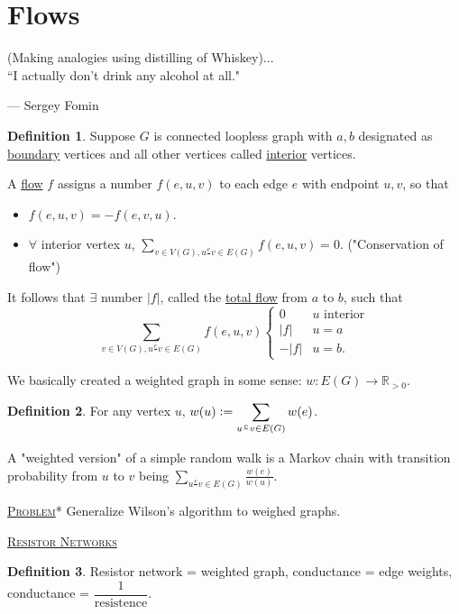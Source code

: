 \documentclass{report}
\newcommand{\R}{\mathbb{R}}
\newcommand{\defeq}{\vcentcolon=}
\newcommand{\fancyem}[1]{\underline{\textsc{#1}}}
\theoremstyle{definition}
\newtheorem{definition}{Definition}[section]
\theoremstyle{remark}
\numberwithin{equation}{section}
\begin{document}
\section{Flows}
\epigraph{(Making analogies using distilling of Whiskey)...\\``I actually don't drink any alcohol at all."}{--- \textup{Sergey Fomin}}
\begin{definition}
    Suppose $G$ is connected loopless graph with $a, b$ designated as \underline{boundary} vertices and all other vertices called \underline{interior} vertices. 
    
    A \underline{flow} $f$ assigns a number $f(e, u, v)$ to each edge $e$ with endpoint $u, v$, so that \begin{itemize}
        \item $f(e, u, v) = -f(e, v, u)$.
        \item $\forall$ interior vertex $u$, $\displaystyle \sum_{v \in V(G), u\frac{e}{}v  \in E(G)} f(e, u, v) = 0$. ("Conservation of flow")
    \end{itemize}
\end{definition}
It follows that $\exists$ number $|f|$, called the \underline{total flow} from $a$ to $b$, such that \begin{equation}\label{eq:1stkirchhoff}
\sum_{v \in V(G), u\frac{e}{}v \in E(G)} f(e, u, v)\begin{cases}
    0 & u \text{ interior} \\
    |f| &  u = a \\
    -|f| & u = b.
\end{cases}    
\end{equation}

We basically created a weighted graph in some sense: $w: E(G) \to \R_{>0}$. 
\begin{definition}
    For any vertex $u$, $\displaystyle w(u) \defeq \sum_{u\frac{e}{}v  \in E(G)} w(e)$.
\end{definition}

A "weighted version" of a simple random walk is a Markov chain with transition probability from $u$ to $v$ being $\displaystyle \sum_{u\frac{e}{}v \in E(G)} \frac{w(e)}{w(u)}$.

\fancyem{Problem}* Generalize Wilson's algorithm to weighed graphs.

\fancyem{Resistor Networks}
\begin{definition}
    Resistor network = weighted graph, conductance = edge weights, conductance = $\dfrac{1}{\text{resistence}}$.
\end{definition}
\end{document}
